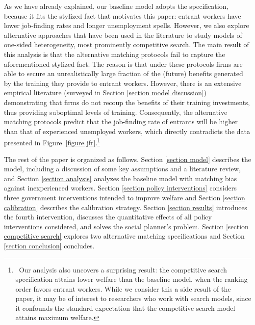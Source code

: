 \documentclass[12pt]{article} %
\theoremstyle{definition}
\begin{document}
As we have already explained, our baseline model adopts the \cite{petrongolo2001looking} specification, because it fits the stylized fact that motivates this paper: entrant workers have lower job-finding rates and longer unemployment spells.
However, we also explore alternative approaches that have been used in the literature to study models of one-sided heterogeneity, most prominently competitive search.
The main result of this analysis is that the alternative matching protocols fail to capture the aforementioned stylized fact.
The reason is that under these protocols firms are able to secure an unrealistically large fraction of the (future) benefits generated by the training they provide to entrant workers. 
However, there is an extensive empirical literature (surveyed in Section \ref{section model discussion}) demonstrating that firms do not recoup the benefits of their training investments, thus providing suboptimal levels of training.
Consequently, the alternative matching protocols predict that the job-finding rate of entrants will be higher than that of experienced unemployed workers, which directly contradicts the data presented in Figure~\ref{figure jfr}.\footnote{\,
Our analysis also uncovers a surprising result: the competitive search specification attains lower welfare than the baseline model, when the ranking order favors entrant workers. While we consider this a side result of the paper, it may be of interest to researchers who work with search models, since it confounds the standard expectation that the competitive search model attains maximum welfare.}

 

The rest of the paper is organized as follows. Section \ref{section model} describes the model, including a discussion of some key assumptions and a literature review, and Section \ref{section analysis} analyzes the baseline model with matching bias against inexperienced workers. Section \ref{section policy interventions} considers three government interventions intended to improve welfare and Section \ref{section calibration} describes the calibration strategy. Section \ref{section results} introduces the fourth intervention, discusses the quantitative effects of all policy interventions considered, and solves the social planner's problem. Section \ref{section competitive search} explores two alternative matching specifications and Section \ref{section conclusion} concludes. 
\end{document}
